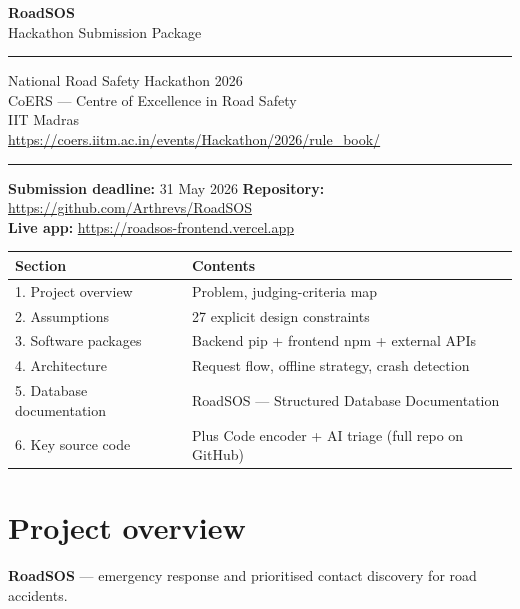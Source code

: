 \documentclass[11pt, a4paper]{article}
\begin{document}
\begin{titlepage}
\centering
\vspace*{3cm}
{\fontsize{48}{56}\selectfont\bfseries\color{rsnavy} RoadSOS}\\[0.8cm]
{\Large\color{rsblue} Hackathon Submission Package}\\[1.5cm]
\hrule\vspace{0.4cm}
{\large\color{rsgrey}
  National Road Safety Hackathon 2026\\[0.3cm]
  CoERS --- Centre of Excellence in Road Safety\\[0.1cm]
  IIT Madras\\[0.4cm]
  \url{https://coers.iitm.ac.in/events/Hackathon/2026/rule_book/}
}
\vspace{0.4cm}\hrule\vspace{1.5cm}
{\normalsize\color{rsgrey}
  \textbf{Submission deadline:} 31 May 2026 \quad
  \textbf{Repository:} \url{https://github.com/Arthrevs/RoadSOS}\\[0.4cm]
  \textbf{Live app:} \url{https://roadsos-frontend.vercel.app}
}
\vfill
\begin{tabular}{ll}
\toprule
\textbf{Section} & \textbf{Contents} \\
\midrule
1. Project overview    & Problem, judging-criteria map \\
2. Assumptions         & 27 explicit design constraints \\
3. Software packages   & Backend pip + frontend npm + external APIs \\
4. Architecture        & Request flow, offline strategy, crash detection \\
5. Database documentation & RoadSOS --- Structured Database Documentation \\
6. Key source code     & Plus Code encoder + AI triage (full repo on GitHub) \\
\bottomrule
\end{tabular}
\end{titlepage}

\tableofcontents
\clearpage


\section{Project overview}

\textbf{RoadSOS} --- emergency response and prioritised contact discovery for road accidents.
\end{document}
